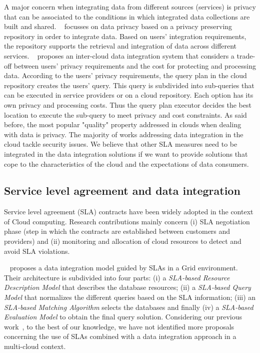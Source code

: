 A major concern when integrating data from different sources (services) is privacy that can be associated to the conditions in which integrated data collections are built and shared.
~\cite{YauY08} focusses on data privacy based on  a privacy preserving repository in order to integrate data. 
Based on users' integration requirements, the repository supports the retrieval and integration of
data across different services. 
~\cite{096} proposes an inter-cloud data integration system that considers a trade-off between users' privacy requirements and the cost for protecting and processing data.
According to the users' privacy requirements, the query plan  in the cloud repository 
creates the users' query. This query is subdivided into sub-queries that can
be  executed in  service providers or on a cloud repository.
Each option has its own  privacy and processing costs.
Thus the query plan executor decides the best location to execute the sub-query
to meet privacy and cost constraints.
As said before, the most popular "quality" property addressed in clouds when dealing with data is privacy. The majority of works addressing data integration in the cloud tackle security issues. We believe that other SLA measures need to be integrated in the data integration solutions if we want to provide solutions that cope to the characteristics of the cloud and the expectations of data consumers.

\subsection{Service level agreement and data integration}

Service level agreement (SLA) contracts have been widely adopted in the context of Cloud computing. Research contributions mainly concern (i) SLA negotiation phase (step in which the
contracts are established between customers and providers) and (ii)
monitoring and allocation of cloud resources to detect and avoid SLA
violations.

 ~\cite{Nie07} proposes a data integration model guided by SLAs in a Grid environment.
Their architecture is subdivided into four parts: (i) a \textit{SLA-based
Resource Description Model} that describes the database resources; (ii)
a \textit{SLA-based Query Model} that normalizes the different queries based on the
SLA information; (iii) an \textit{SLA-based Matching Algorithm}  
selects the databases and finally (iv) a \textit{SLA-based Evaluation Model}
 to obtain the final query solution.
Considering our previous work~\cite{012}, to the best of our knowledge, we have
not identified more proposals concerning the use of SLAs combined with a data
integration approach in a multi-cloud context.
